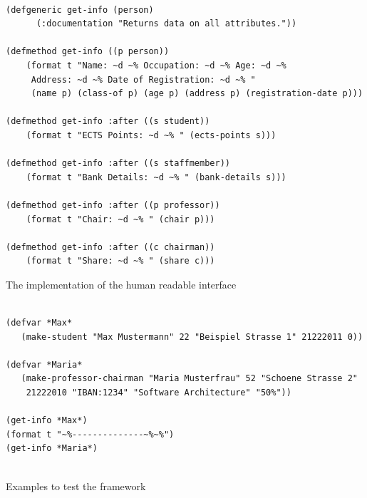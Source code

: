 \documentclass[oribibl]{llncs}
\begin{document}
\begin{listing}[]%
\begin{verbatim}

(defgeneric get-info (person)
      (:documentation "Returns data on all attributes."))

(defmethod get-info ((p person))
    (format t "Name: ~d ~% Occupation: ~d ~% Age: ~d ~% 
     Address: ~d ~% Date of Registration: ~d ~% "
     (name p) (class-of p) (age p) (address p) (registration-date p)))

(defmethod get-info :after ((s student))
    (format t "ECTS Points: ~d ~% " (ects-points s)))

(defmethod get-info :after ((s staffmember))
    (format t "Bank Details: ~d ~% " (bank-details s)))

(defmethod get-info :after ((p professor))
    (format t "Chair: ~d ~% " (chair p)))

(defmethod get-info :after ((c chairman))
    (format t "Share: ~d ~% " (share c)))

\end{verbatim}
\caption{The implementation of the human readable interface}
\label{lst:implementation}
\end{listing}


\begin{listing}[]%
\begin{verbatim}

(defvar *Max* 
   (make-student "Max Mustermann" 22 "Beispiel Strasse 1" 21222011 0))

(defvar *Maria* 
   (make-professor-chairman "Maria Musterfrau" 52 "Schoene Strasse 2" 
    21222010 "IBAN:1234" "Software Architecture" "50%"))

(get-info *Max*)
(format t "~%--------------~%~%")
(get-info *Maria*)


\end{verbatim}
\caption{Examples to test the framework}
\label{lst:examples}
\end{listing}
\end{document}

